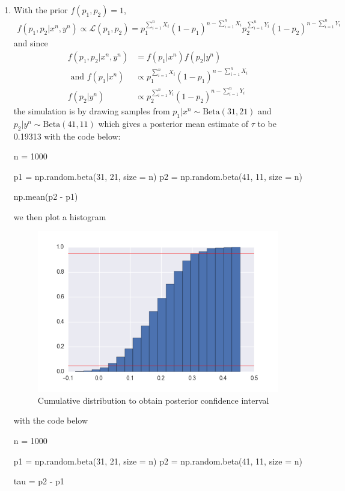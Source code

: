 \documentclass[a4paper,10pt]{article}
\theoremstyle{definition}
\begin{document}
\begin{enumerate}
\begin{enumerate}
\item With the prior $f(p_1,p_2) = 1$, 
\begin{align*}
f(p_1,p_2|x^n,y^n) \propto \mathcal{L}(p_1,p_2)= p_1^{\sum_{i=1}^{n} X_i}(1-p_1)^{n-\sum_{i=1}^{n} X_i}p_2^{\sum_{i=1}^{n} Y_i}(1-p_2)^{n-\sum_{i=1}^{n} Y_i}
\end{align*}
and since
\begin{align*}
f(p_1,p_2|x^n,y^n) &= f(p_1|x^n)f(p_2|y^n)\\
\text{ and }f(p_1|x^n)&\propto p_1^{\sum_{i=1}^{n} X_i}(1-p_1)^{n-\sum_{i=1}^{n} X_i}\\
f(p_2|y^n)&\propto p_2^{\sum_{i=1}^{n} Y_i}(1-p_2)^{n-\sum_{i=1}^{n} Y_i}
\end{align*}
the simulation is by drawing samples from $p_1 | x^n \sim \text{Beta}(31,21)$ and $p_2 | y^n \sim \text{Beta}(41,11)$ which gives a posterior mean estimate of $\tau$ to be 0.19313 with the code below:
\begin{python}
n = 1000

p1 = np.random.beta(31, 21, size = n)
p2 = np.random.beta(41, 11, size = n)

np.mean(p2 - p1)
\end{python}
we then plot a histogram 
\begin{figure}[h]
\centering
\includegraphics[scale=1]{posteriorCI1.png}
\caption{Cumulative distribution to obtain posterior confidence interval}
\end{figure}
with the code below
\begin{python}
n = 1000

p1 = np.random.beta(31, 21, size = n)
p2 = np.random.beta(41, 11, size = n)

tau = p2 - p1


\end{python}
\end{enumerate}
\end{enumerate}
\end{document}

